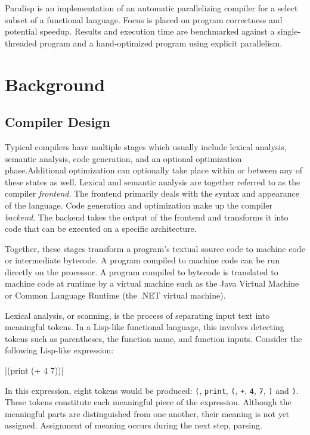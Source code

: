 \documentclass[
abstracton,
fontsize=12pt,
]{scrartcl}
\begin{document}
Paralisp is an implementation of an automatic parallelizing compiler for a select subset of a functional language. Focus is placed on program correctness and potential speedup. Results and execution time are benchmarked against a single-threaded program and a hand-optimized program using explicit parallelism.

\section{Background}

\subsection{Compiler Design}

Typical compilers have multiple stages which usually include lexical analysis, semantic analysis, code generation, and an optional optimization phase.Additional optimization can optionally take place within or between any of these states as well. Lexical and semantic analysis are together referred to as the compiler \textit{frontend}. The frontend primarily deals with the syntax and appearance of the language. Code generation and optimization make up the compiler \textit{backend}. The backend takes the output of the frontend and transforms it into code that can be executed on a specific architecture.

Together, these stages transform a program's textual source code to machine code or intermediate bytecode. A program compiled to machine code can be run directly on the processor. A program compiled to bytecode is translated to machine code at runtime by a virtual machine such as the Java Virtual Machine or Common Language Runtime (the .NET virtual machine).

Lexical analysis, or scanning, is the process of separating input text into meaningful tokens. In a Lisp-like functional language, this involves detecting tokens such as parentheses, the function name, and function inputs. Consider the following Lisp-like expression:

\scheme|(print (+ 4 7))|

In this expression, eight tokens would be produced: \verb|(|, \verb|print|, \verb|(|, \verb|+|, \verb|4|, \verb|7|, \verb|)| and \verb|)|. These tokens constitute each meaningful piece of the expression. Although the meaningful parts are distinguished from one another, their meaning is not yet assigned. Assignment of meaning occurs during the next step, parsing.
\end{document}
